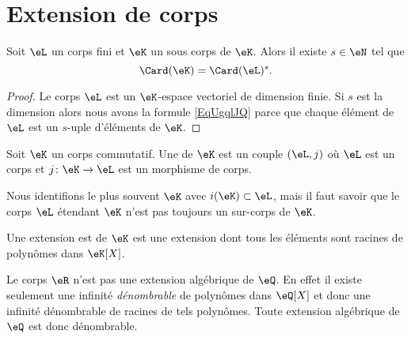 \section{Extension de corps}
\label{SECooLQVJooTGeqiR}

\begin{lemma}       \label{LemobATFP}
    Soit \( \eL\) un corps fini et \( \eK\) un sous corps de \( \eK\). Alors il existe \( s\in \eN\) tel que
    \begin{equation}        \label{EqUgqlJQ}
        \Card(\eK)=\Card(\eL)^s.
    \end{equation}
\end{lemma}

\begin{proof}
    Le corps \( \eL\) est un \( \eK\)-espace vectoriel de dimension finie. Si \( s\) est la dimension alors nous avons la formule \eqref{EqUgqlJQ} parce que chaque élément de \( \eL\) est un \( s\)-uple d'éléments de \( \eK\).
\end{proof}

\begin{definition}     \label{DEFooFLJJooGJYDOe}
    Soit \( \eK\) un corps commutatif. Une  de \( \eK\) est un couple \( (\eL,j)\) où \( \eL\) est un corps et \( j\colon \eK\to \eL\) est un morphisme de corps.
\end{definition}

    Nous identifions le plus souvent \( \eK\) avec \( i(\eK)\subset \eL\), mais il faut savoir que le corps \( \eL\) étendant \( \eK\) n'est pas toujours un sur-corps de \( \eK\).
    
\begin{definition}
    Une extension est  de \( \eK\) est une extension dont tous les éléments sont racines de polynômes dans \( \eK[X]\).
\end{definition}

\begin{example}
    Le corps \( \eR\) n'est pas une extension algébrique de \( \eQ\). En effet il existe seulement une infinité \emph{dénombrable} de polynômes dans \( \eQ[X]\) et donc une infinité dénombrable de racines de tels polynômes. Toute extension algébrique de \( \eQ\) est donc dénombrable.
\end{example}

